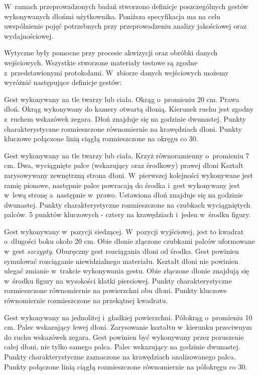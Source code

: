     W~ramach przeprowadzonych badań stworzono definicje poszczególnych gestów wykonywanych dłońmi użytkownika. Poniższa specyfikacja ma na celu uwspólnienie pojęć potrzebnych przy przeprowadzeniu analizy jakościowej oraz wydajnościowej.

    Wytyczne były pomocne przy procesie akwizycji oraz obróbki danych wejściowych. Wszystkie stworzone materiały testowe są zgodne z~przedstawionymi protokołami. W~zbiorze danych wejściowych możemy wyróżnić następujące definicje gestów:

         {Gest wykonywany na tle twarzy lub ciała.}
         {Okrąg o~promieniu 20 cm.}
         {Prawa dłoń.}
         {Okrąg wykonywany do kamery otwartą dłonią.}
         {Kierunek ruchu jest zgodny z~ruchem wskazówek zegara.}
         {Dłoń znajduje się na godzinie dwunastej.}
         {Punkty charakterystyczne rozmieszczone równomiernie na krawędziach dłoni.}
         {Punkty kluczowe połączone linią ciągłą rozmieszczone na okręgu co 30\degree.}

    \newpage
         {Gest wykonywany na tle twarzy lub ciała.}
         {Krzyż równoramienny o~promieniu 7 cm.}
         {Dwa, wyciągnięte palce (wskazujący oraz środkowy) prawej dłoni}
         {Kształt zarysowywany zewnętrzną strona dłoni.}
         {W~pierwszej kolejności wykonywane jest ramię pionowe, następnie palce powracają do środka i~gest wykonywany jest w~lewą stronę a~następnie w~prawo.}
         {Ustawiona dłoń znajduje się na godzinie dwunastej.}
         {Punkty charakterystyczne rozmieszczone na czubkach wyciągniętych palców.}
         {5 punktów kluczowych - cztery na krawędziach i~jeden w~środku figury.}

         {Gest wykonywany w~pozycji siedzącej.}
         {W~pozycji wyjściowej, jest to kwadrat o~długości boku około 20 cm.}
         {Obie dłonie złączone czubkami palców uformowane w~gest \textit{szczypty}.}
         {Oburęczny gest rozciągania dłoni od środka.}
         {Gest powinien symulować rozciąganie niewidzialnego materiału. Kształt dłoni nie powinien ulegać zmianie w~trakcie wykonywania gestu.}
         {Obie złączone dłonie znajdują się w~środku figury na wysokości klatki piersiowej.}
         {Punkty charakterystyczne rozmieszczone równomiernie na powierzchni obu dłoni.}
         {Punkty kluczowe równomiernie rozmieszczone na przekątnej kwadratu.}

    \newpage
         {Gest wykonywany na jednolitej i~gładkiej powierzchni.}
         {Półokrąg o~promieniu 10 cm.}
         {Palec wskazujący lewej dłoni.}
         {Zarysowanie kształtu w~kierunku przeciwnym do ruchu wskazówek zegara.}
         {Gest powinien być wykonywany przez poruszenie całej dłoni, nie tylko samego palca.}
         {Palec wskazujący na godzinie dwunastej.}
         {Punkty charakterystyczne zaznaczone na krawędziach analizowanego palca.}
         {Punkty połączone linią ciągłą rozmieszczone równomiernie na półokręgu co 30\degree.}

